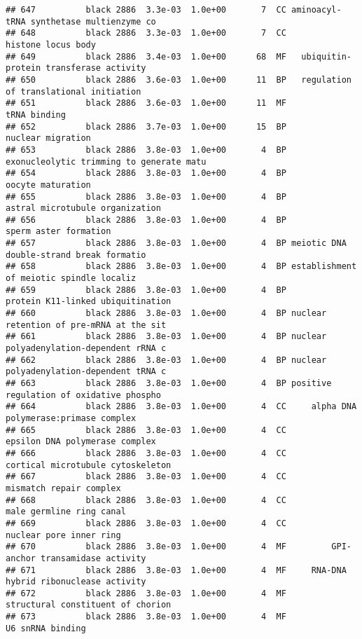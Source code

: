 \documentclass[]{article}
\begin{document}
\begin{verbatim}
## 647          black 2886  3.3e-03  1.0e+00       7  CC aminoacyl-tRNA synthetase multienzyme co
## 648          black 2886  3.3e-03  1.0e+00       7  CC                       histone locus body
## 649          black 2886  3.4e-03  1.0e+00      68  MF   ubiquitin-protein transferase activity
## 650          black 2886  3.6e-03  1.0e+00      11  BP   regulation of translational initiation
## 651          black 2886  3.6e-03  1.0e+00      11  MF                             tRNA binding
## 652          black 2886  3.7e-03  1.0e+00      15  BP                        nuclear migration
## 653          black 2886  3.8e-03  1.0e+00       4  BP exonucleolytic trimming to generate matu
## 654          black 2886  3.8e-03  1.0e+00       4  BP                        oocyte maturation
## 655          black 2886  3.8e-03  1.0e+00       4  BP          astral microtubule organization
## 656          black 2886  3.8e-03  1.0e+00       4  BP                    sperm aster formation
## 657          black 2886  3.8e-03  1.0e+00       4  BP meiotic DNA double-strand break formatio
## 658          black 2886  3.8e-03  1.0e+00       4  BP establishment of meiotic spindle localiz
## 659          black 2886  3.8e-03  1.0e+00       4  BP        protein K11-linked ubiquitination
## 660          black 2886  3.8e-03  1.0e+00       4  BP nuclear retention of pre-mRNA at the sit
## 661          black 2886  3.8e-03  1.0e+00       4  BP nuclear polyadenylation-dependent rRNA c
## 662          black 2886  3.8e-03  1.0e+00       4  BP nuclear polyadenylation-dependent tRNA c
## 663          black 2886  3.8e-03  1.0e+00       4  BP positive regulation of oxidative phospho
## 664          black 2886  3.8e-03  1.0e+00       4  CC     alpha DNA polymerase:primase complex
## 665          black 2886  3.8e-03  1.0e+00       4  CC           epsilon DNA polymerase complex
## 666          black 2886  3.8e-03  1.0e+00       4  CC        cortical microtubule cytoskeleton
## 667          black 2886  3.8e-03  1.0e+00       4  CC                  mismatch repair complex
## 668          black 2886  3.8e-03  1.0e+00       4  CC                 male germline ring canal
## 669          black 2886  3.8e-03  1.0e+00       4  CC                  nuclear pore inner ring
## 670          black 2886  3.8e-03  1.0e+00       4  MF         GPI-anchor transamidase activity
## 671          black 2886  3.8e-03  1.0e+00       4  MF     RNA-DNA hybrid ribonuclease activity
## 672          black 2886  3.8e-03  1.0e+00       4  MF        structural constituent of chorion
## 673          black 2886  3.8e-03  1.0e+00       4  MF                         U6 snRNA binding

\end{verbatim}
\end{document}
